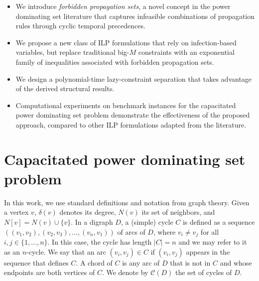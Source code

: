 \documentclass{article}
\newcommand{\CC}{{\mathscr C}}
\begin{document}
\begin{itemize}
\item We introduce \emph{forbidden propagation sets}, a novel concept in the power dominating set literature that captures infeasible combinations of propagation rules through cyclic temporal precedences.
\item We propose a new class of ILP formulations that rely on infection-based variables, but replace traditional big-$M$ constraints with an exponential family of inequalities associated with forbidden propagation sets.
\item We design a polynomial-time lazy-constraint separation that takes advantage of the derived structural results.
\item Computational experiments on benchmark instances for the capacitated power dominating set problem demonstrate the effectiveness of the proposed approach, compared to other ILP formulations adapted from the literature.
\end{itemize}

\section{Capacitated power dominating set problem}\label{sec.cpds}

In this work, we use standard definitions and notation from graph theory.
Given a vertex $v$, $\delta(v)$ denotes its degree, $N(v)$ its set of neighbors, and $N[v] = N(v) \cup \{v\}$.
In a digraph $D$, a (simple) cycle $C$ is defined as a sequence $((v_1,v_2), (v_2,v_3), \ldots, (v_n,v_1))$ of arcs of $D$, where $v_i \neq v_j$ for all $i,j \in \{1,\dots,n\}$. In this case, the cycle has length $|C|=n$ and we may refer to it as an $n$-cycle.
We say that an arc $(v_i,v_j) \in C$ if $(v_i,v_j)$ appears in the sequence that defines $C$.
A chord of $C$ is any arc of $D$ that is not in $C$ and whose endpoints are both vertices of $C$.
We denote by $\CC(D)$ the set of cycles of $D$.
\end{document}

